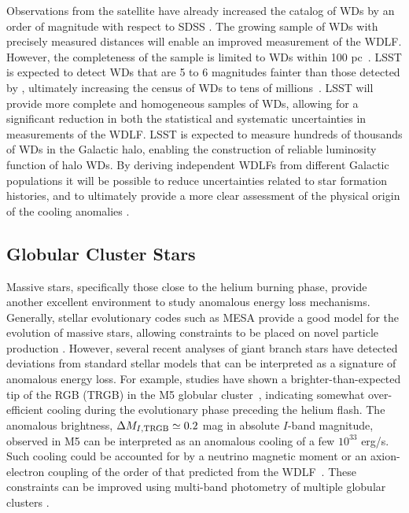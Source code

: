 Observations from the \Gaia satellite have already increased the catalog of WDs by an order of magnitude with respect to SDSS \citep{1805.01227,1807.03315,1807.02559}.
The growing sample of WDs with precisely measured distances will enable an improved measurement of the WDLF.  
However, the completeness of the \Gaia sample is limited to WDs within 100 pc~\citep{1807.03315}.
LSST is expected to detect WDs that are 5 to 6 magnitudes fainter than those detected by \Gaia, ultimately increasing the census of WDs to tens of millions~\citep{0912.0201}.
LSST will provide more complete and homogeneous samples of WDs, allowing for a significant reduction in both the statistical and systematic uncertainties in measurements of the WDLF. 
LSST is expected to measure hundreds of thousands of WDs in the Galactic halo, enabling the construction of reliable luminosity function of halo WDs. 
By deriving independent WDLFs from different Galactic populations it will be possible to reduce uncertainties related to star formation histories, and to ultimately provide a more clear assessment of the physical origin of the cooling anomalies \citep{Isern:2018uce}. 


\subsection{Globular Cluster Stars}


Massive stars, specifically those close to the helium burning phase, provide another excellent environment to study anomalous energy loss mechanisms. 
Generally, stellar evolutionary codes such as MESA \citep{1009.1622} provide a good model for the evolution of massive stars, allowing constraints to be placed on novel particle production \citep[\eg,][]{1210.1271,1611.05852}.
However, several recent analyses of giant branch stars have detected deviations from standard stellar models that can be interpreted as a signature of anomalous energy loss.
For example, studies have shown a brighter-than-expected tip of the RGB (TRGB) in the M5 globular cluster~\citep{Viaux:2013lha,Viaux:2013hca}, indicating somewhat over-efficient cooling during the evolutionary phase preceding the helium flash.
The anomalous brightness, $\Delta M_{I,{\rm TRGB}}\simeq 0.2$ mag in absolute $I$-band magnitude, observed in M5  can be interpreted as an anomalous cooling of a few $10^{33}$ erg/s.
Such cooling could be accounted for by a neutrino magnetic moment or an axion-electron coupling of the order of that predicted from the WDLF~\citep{Viaux:2013lha}. 
These constraints can be improved using multi-band photometry of multiple globular clusters \citep[\eg,][]{Straniero:2018fbv}.

